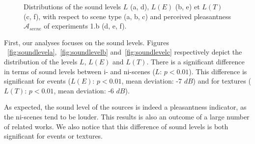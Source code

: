 \documentclass[12pt]{elsarticle}
\begin{document}
\begin{figure}[t]
       \caption{Distributions of the sound levels $L$ (a, d), $L(E)$ (b, e) et $L(T)$ (c, f), with respect to scene type (a, b, c) and perceived pleasantness $\mathcal{A}_{scene}$ of experiments 1.b (d, e, f).}
\end{figure}


First, our analyses focuses on the sound levels. Figures ~\ref{fig:soundlevela},~\ref{fig:soundlevelb} and~\ref{fig:soundlevelc} respectively depict the distribution of the levels $L$, $L(E)$ and $L(T)$. There is a significant difference in terms of sound levels between i- and ni-scenes ($L$: $p<0.01$). This difference is significant for events ($L(E)$: $p<0.01$, mean deviation: -7 $dB$) and for textures ($L(T)$: $p<0.01$, mean deviation: -6 $dB$).


As expected, the sound level of the sources is indeed a pleasantness indicator, as the ni-scenes tend to be louder. This results is also an outcome of a large number of related works. We also notice that this difference of sound levels is both significant for events or textures.
\end{document}
